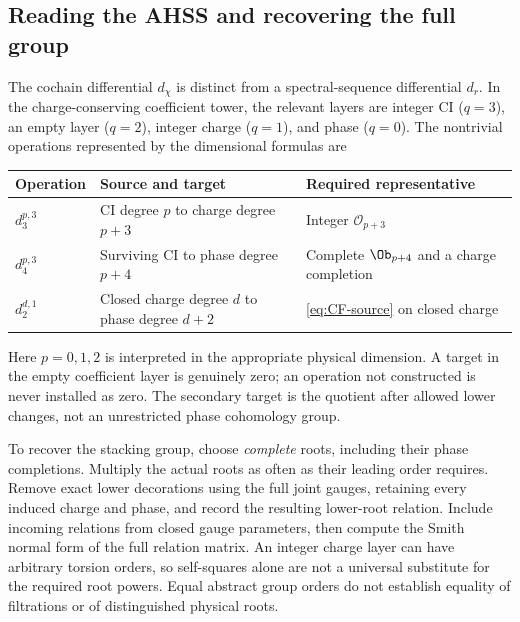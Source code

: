 \subsection{Reading the AHSS and recovering the full group}\label{sec:AHSS}
The cochain differential $d_\chi$ is distinct from a spectral-sequence differential $d_r$. In the charge-conserving coefficient tower, the relevant layers are integer CI ($q=3$), an empty layer ($q=2$), integer charge ($q=1$), and phase ($q=0$). The nontrivial operations represented by the dimensional formulas are
\begin{center}
\begin{tabularx}{\textwidth}{@{}lXX@{}}\toprule
Operation & Source and target & Required representative\\\midrule
$d_3^{p,3}$ & CI degree $p$ to charge degree $p+3$ & Integer $\mathcal O_{p+3}$\\
$d_4^{p,3}$ & Surviving CI to phase degree $p+4$ & Complete $\Ob_{p+4}$ and a charge completion\\
$d_2^{d,1}$ & Closed charge degree $d$ to phase degree $d+2$ & \eqref{eq:CF-source} on closed charge\\\bottomrule
\end{tabularx}
\end{center}
Here $p=0,1,2$ is interpreted in the appropriate physical dimension. A target in the empty coefficient layer is genuinely zero; an operation not constructed is never installed as zero. The secondary target is the quotient after allowed lower changes, not an unrestricted phase cohomology group.

To recover the stacking group, choose \emph{complete} roots, including their phase completions. Multiply the actual roots as often as their leading order requires. Remove exact lower decorations using the full joint gauges, retaining every induced charge and phase, and record the resulting lower-root relation. Include incoming relations from closed gauge parameters, then compute the Smith normal form of the full relation matrix. An integer charge layer can have arbitrary torsion orders, so self-squares alone are not a universal substitute for the required root powers. Equal abstract group orders do not establish equality of filtrations or of distinguished physical roots.
